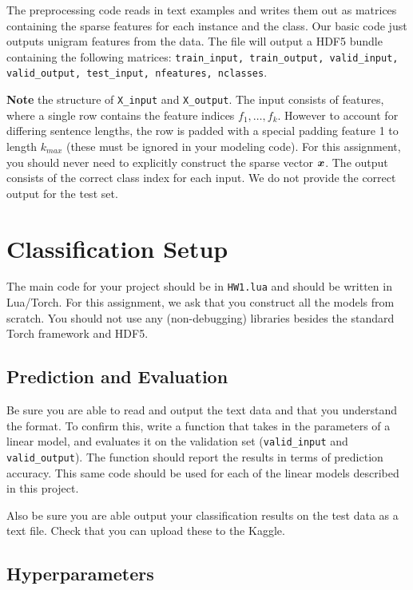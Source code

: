 \documentclass[11pt]{article}
\begin{document}
The preprocessing code reads in text examples and writes them
out as matrices containing the sparse features for each instance and
the class. Our basic code just outputs unigram features from the data.
The file will output a HDF5 bundle containing the following matrices:
\texttt{train\_input, train\_output, valid\_input, valid\_output,
  test\_input, nfeatures, nclasses}.

\textbf{Note} the structure of \texttt{X\_input} and
\texttt{X\_output}. The input consists of features, where a single row
contains the feature indices $f_1, \ldots, f_k$. However to account
for differing sentence lengths, the row is padded with a special
padding feature 1 to length $k_{max}$ (these must be ignored in your modeling
code).  For this assignment, you should never need to explicitly
construct the sparse vector $\boldsymbol{x}$. The output consists of the
correct class index for each input. We do not provide the correct
output for the test set.

\section{Classification Setup}

The main code for your project should be in \texttt{HW1.lua} and
should be written in Lua/Torch. For this assignment, we ask that you
construct all the models from scratch. You should not use any
(non-debugging) libraries besides the standard Torch framework and HDF5.

\subsection{Prediction and Evaluation}

Be sure you are able to read and output the text data and that you
understand the format. To confirm this, write a function that takes in
the parameters of a linear model, and evaluates it on the validation
set (\texttt{valid\_input} and \texttt{valid\_output}).  The function
should report the results in terms of prediction accuracy. This same
code should be used for each of the linear models described in this
project.

Also be sure you are able output your classification results on the
test data as a text file. Check that you can upload these to the
Kaggle.

\subsection{Hyperparameters}
\end{document}
